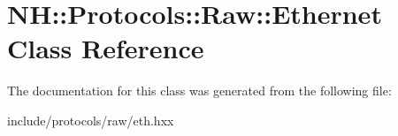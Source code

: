\hypertarget{class_n_h_1_1_protocols_1_1_raw_1_1_ethernet}{\section{N\+H\+:\+:Protocols\+:\+:Raw\+:\+:Ethernet Class Reference}
\label{class_n_h_1_1_protocols_1_1_raw_1_1_ethernet}
}


The documentation for this class was generated from the following file\+:\begin{DoxyCompactItemize}
\item 
include/protocols/raw/eth.\+hxx\end{DoxyCompactItemize}
